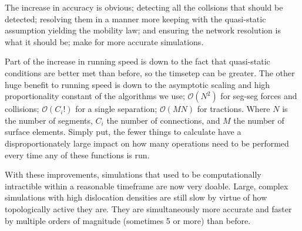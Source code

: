 The increase in accuracy is obvious; detecting all the collsions that should be detected; resolving them in a manner more keeping with the quasi-static assumption yielding the mobility law; and ensuring the network resolution is what it should be; make for more accurate simulations.

Part of the increase in running speed is down to the fact that quasi-static conditions are better met than before, so the timsetep can be greater. The other huge benefit to running speed is down to the asymptotic scaling and high proportionality constant of the algorithms we use; $\mathcal{O}(N^2)$ for seg-seg forces and collisions; $\mathcal{O}(C_i!)$ for a single separation; $\mathcal{O}(M N)$ for tractions. Where $N$ is the number of segments, $C_i$ the number of connections, and $M$ the number of surface elements. Simply put, the fewer things to calculate have a disproportionately large impact on how many operations need to be performed every time any of these functions is run.

With these improvements, simulations that used to be computationally intractible within a reasonable timeframe are now very doable. Large, complex simulations with high dislocation densities are still slow by virtue of how topologically active they are. They are simultaneously more accurate and faster by multiple orders of magnitude (sometimes 5 or more) than before.
\savearabiccounter
